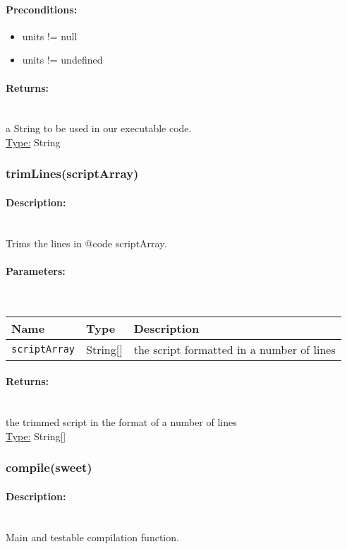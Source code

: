 \paragraph{Preconditions:} 
\begin{itemize}  
\item  units != null
\item  units != undefined
\end{itemize}  
\paragraph{Returns:} \hfill \\ 
a String to be used in our executable code.\\ 
\underline{Type:} String
\subsubsection{trimLines(scriptArray)} 
\paragraph{Description:} \hfill \\ 
Trims the lines in {@code scriptArray}.
\paragraph{Parameters:} \hfill \\ 
\begin{tabular}{|l|l|l|}
\hline
\textbf{Name} & \textbf{Type} & \textbf{Description} \\ 
\hline
\texttt{scriptArray} & String[] & the script formatted in a number of lines\\ 
\hline
\end{tabular}
\paragraph{Returns:} \hfill \\ 
the trimmed script in the format of a number of lines\\ 
\underline{Type:} String[]
\subsubsection{compile(sweet)} 
\paragraph{Description:} \hfill \\ 
Main and testable compilation function.
